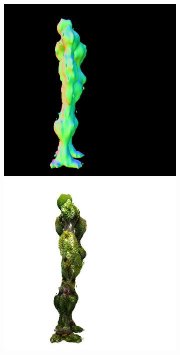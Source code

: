 \begin{figure}[ht]
\begin{subfigure}[b]{0.222\textwidth}
        \caption{}
    \end{subfigure}
    \begin{subfigure}[b]{0.222\textwidth}
        \centering
        \fontsize{9pt}{7pt}\selectfont{}\vspace{.1cm}
        \includegraphics[width=\textwidth]{etc/a robot made out of plants/magic123/magic123_refine_robot_right_10000_part2.png}
        \includegraphics[width=\textwidth]{etc/a robot made out of plants/magic123/magic123_refine_robot_right_10000_part1.png}

\end{subfigure}
\end{figure}
